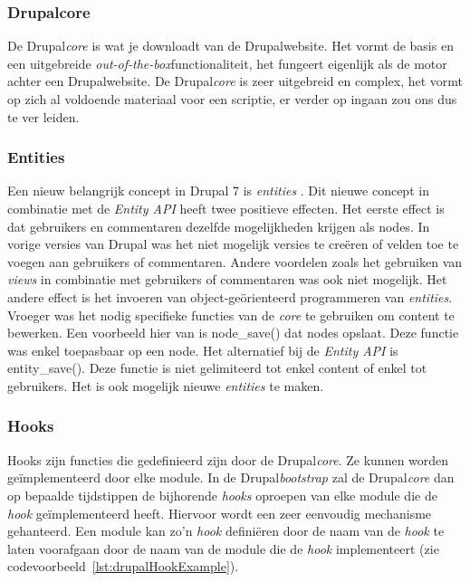 \subsubsection{Drupalcore}
De Drupal\textit{core} is wat je downloadt van de Drupalwebsite. Het vormt de basis en een uitgebreide \textit{out-of-the-box}functionaliteit, het fungeert eigenlijk als de motor achter een Drupalwebsite. De Drupal\textit{core} is zeer uitgebreid en complex, het vormt op zich al voldoende materiaal voor een scriptie, er verder op ingaan zou ons dus te ver leiden.

\subsubsection{Entities}
Een nieuw belangrijk concept in Drupal 7 is \textit{entities} \cite{entities}. Dit nieuwe concept in combinatie met de \textit{Entity API} heeft twee positieve effecten. Het eerste effect is dat gebruikers en commentaren dezelfde mogelijkheden krijgen als nodes. In vorige versies van Drupal was het niet mogelijk versies te cre\"{e}ren of velden toe te voegen aan gebruikers of commentaren. Andere voordelen zoals het gebruiken van \textit{views} in combinatie met gebruikers of commentaren was ook niet mogelijk. Het andere effect is het invoeren van object-ge\"{o}rienteerd programmeren van \textit{entities}. Vroeger was het nodig specifieke functies van de \textit{core} te gebruiken om content te bewerken. Een voorbeeld hier van is node\_save() dat nodes opslaat. Deze functie was enkel toepasbaar op een node. Het alternatief bij de \textit{Entity API} is entity\_save(). Deze functie is niet gelimiteerd tot enkel content of enkel tot gebruikers.
Het is ook mogelijk nieuwe \textit{entities} te maken. %

\subsubsection{Hooks}
Hooks zijn functies die gedefinieerd zijn door de Drupal\textit{core}. Ze kunnen worden ge\"{i}mplementeerd door elke module. In de Drupal\textit{bootstrap} zal de Drupal\textit{core} dan op bepaalde tijdstippen de bijhorende \textit{hooks} oproepen van elke module die de \textit{hook} ge\"{i}mplementeerd heeft. Hiervoor wordt een zeer eenvoudig mechanisme gehanteerd. Een module kan zo'n \textit{hook} defini\"{e}ren door de naam van de \textit{hook} te laten voorafgaan door de naam van de module die de \textit{hook} implementeert (zie codevoorbeeld~\ref{lst:drupalHookExample}).

